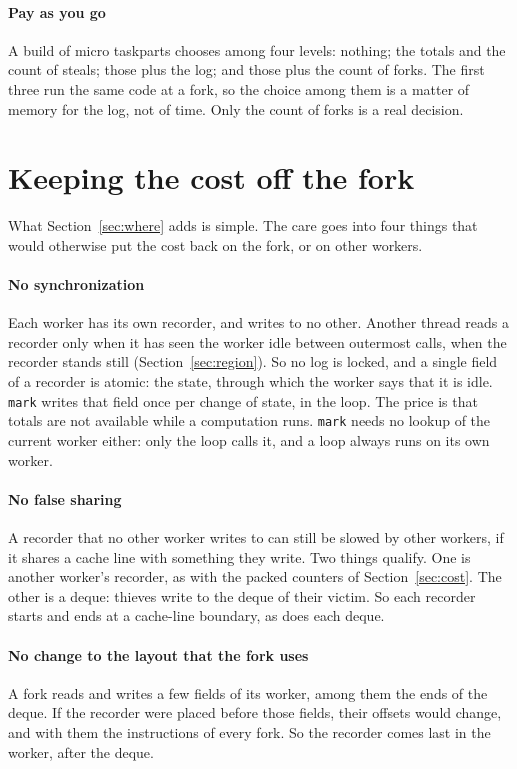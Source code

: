 \documentclass[sigplan,nonacm]{acmart}
\begin{document}
\paragraph{Pay as you go}
%
A build of micro taskparts chooses among four levels: nothing; the
totals and the count of steals; those plus the log; and those plus the
count of forks.
%
The first three run the same code at a fork, so the choice among them
is a matter of memory for the log, not of time.
%
Only the count of forks is a real decision.

\section{Keeping the cost off the fork}
\label{sec:techniques}

What Section~\ref{sec:where} adds is simple.
%
The care goes into four things that would otherwise put the cost back
on the fork, or on other workers.

\paragraph{No synchronization}
%
Each worker has its own recorder, and writes to no other.
%
Another thread reads a recorder only when it has seen the worker idle
between outermost calls, when the recorder stands still
(Section~\ref{sec:region}).
%
So no log is locked, and a single field of a recorder is atomic: the
state, through which the worker says that it is idle.
%
\lstinline|mark| writes that field once per change of state, in the
loop.
%
The price is that totals are not available while a computation runs.
%
\lstinline|mark| needs no lookup of the current worker either: only
the loop calls it, and a loop always runs on its own worker.

\paragraph{No false sharing}
%
A recorder that no other worker writes to can still be slowed by
other workers, if it shares a cache line with something they write.
%
Two things qualify.
%
One is another worker's recorder, as with the packed counters of
Section~\ref{sec:cost}.
%
The other is a deque: thieves write to the deque of their victim.
%
So each recorder starts and ends at a cache-line boundary, as does
each deque.

\paragraph{No change to the layout that the fork uses}
%
A fork reads and writes a few fields of its worker, among them the
ends of the deque.
%
If the recorder were placed before those fields, their offsets would
change, and with them the instructions of every fork.
%
So the recorder comes last in the worker, after the deque.
\end{document}
